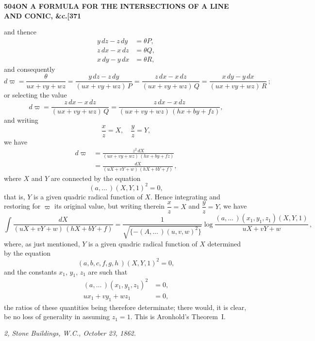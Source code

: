 \documentclass[11pt,a4paper]{article}
\begin{document}
\newpage
\noindent\textbf{504\hspace{1em}ON A FORMULA FOR THE INTERSECTIONS OF A LINE AND CONIC, \&c.\hfill[371}

\vspace{12pt}

\noindent
and thence
\begin{align*}
y\,dz - z\,dy &= \theta P,\\
z\,dx - x\,dz &= \theta Q,\\
x\,dy - y\,dx &= \theta R,
\end{align*}
and consequently
\[
d\varpi = \frac{\theta}{ux + vy + wz}
= \frac{y\,dz - z\,dy}{(ux + vy + wz)\,P}
= \frac{z\,dx - x\,dz}{(ux + vy + wz)\,Q}
= \frac{x\,dy - y\,dx}{(ux + vy + wz)\,R}\,;
\]
or selecting the value
\[
d\varpi = \frac{z\,dx - x\,dz}{(ux + vy + wz)\,Q}
= \frac{z\,dx - x\,dz}{(ux + vy + wz)\,(hx + by + fz)},
\]
and writing
\[
\frac{x}{z} = X,\quad \frac{y}{z} = Y,
\]
we have
\begin{align*}
d\varpi &= \frac{z^{2}\,dX}{(ux + vy + wz)\,(hx + by + fz)}\\
&= \frac{dX}{(uX + vY + w)\,(hX + bY + f)}\,,
\end{align*}
where $X$ and $Y$ are connected by the equation
\[
(a, \ldots \,)(X, Y, 1)^{2} = 0,
\]
that is, $Y$ is a given quadric radical function of $X$. Hence integrating and restoring for $\varpi$ its original value, but writing therein $\dfrac{x}{z} = X$ and $\dfrac{y}{z} = Y$, we have
\[
\int \frac{dX}{(uX + vY + w)\,(hX + bY + f)}
= \frac{1}{\sqrt{\{- (A, \ldots \,)(u, v, w)^{2}\}}}
\log \frac{(a, \ldots \,)(x_{1}, y_{1}, z_{1})(X, Y, 1)}{uX + vY + w}\,,
\]
where, as just mentioned, $Y$ is a given quadric radical function of $X$ determined by the equation
\[
(a, b, c, f, g, h \,)(X, Y, 1)^{2} = 0,
\]
and the constants $x_{1}$, $y_{1}$, $z_{1}$ are such that
\begin{align*}
(a, \ldots \,)(x_{1}, y_{1}, z_{1})^{2} &= 0,\\
ux_{1} + vy_{1} + wz_{1} &= 0,
\end{align*}
the ratios of these quantities being therefore determinate; there would, it is clear, be no loss of generality in assuming $z_{1} = 1$. This is Aronhold's Theorem~I.

\begin{flushright}
\textit{2, Stone Buildings, W.C., October 23, 1862.}
\end{flushright}

\vspace{24pt}
\end{document}
